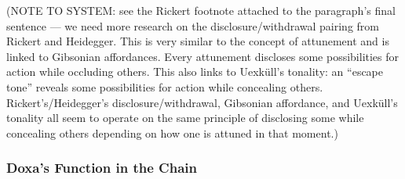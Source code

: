 \documentclass{article}
\begin{document}
(NOTE TO SYSTEM: see the Rickert footnote attached to the paragraph's final sentence --- we need more research on the disclosure/withdrawal pairing from Rickert and Heidegger. This is very similar to the concept of attunement and is linked to Gibsonian affordances. Every attunement discloses some possibilities for action while occluding others. This also links to Uexküll's tonality: an ``escape tone'' reveals some possibilities for action while concealing others. Rickert's/Heidegger's disclosure/withdrawal, Gibsonian affordance, and Uexküll's tonality all seem to operate on the same principle of disclosing some while concealing others depending on how one is attuned in that moment.)

\subsubsection*{Doxa's Function in the Chain}
\end{document}
